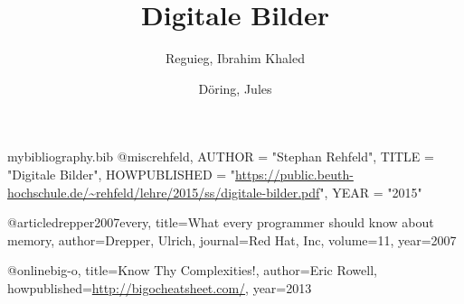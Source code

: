 \RequirePackage{filecontents}
\begin{filecontents}{mybibliography.bib}
@misc{rehfeld,
	AUTHOR = "Stephan Rehfeld",
	TITLE = "{Digitale Bilder}",
	HOWPUBLISHED = "{\url{https://public.beuth-hochschule.de/~rehfeld/lehre/2015/ss/digitale-bilder.pdf}}",
	YEAR = "{2015}"
}

@article{drepper2007every,
  title={What every programmer should know about memory},
  author={Drepper, Ulrich},
  journal={Red Hat, Inc},
  volume={11},
  year={2007}
}

@online{big-o,
  title={Know Thy Complexities!},
  author={Eric Rowell},
  howpublished={\url{http://bigocheatsheet.com/}},
  year={2013}
}

\end{filecontents}	

\documentclass[tog]{acmsiggraph}


\def\BibTeX{{\rm B\kern-.05em{\sc i\kern-.025em b}\kern-.08em
   T\kern-.1667em\lower.7ex\hbox{E}\kern-.125emX}}

\usepackage{listings}

\usepackage{hyperref}

\usepackage[utf8]{inputenc}


\usepackage{cite}

\usepackage{amsfonts}

\usepackage[ngerman]{babel}

\usepackage[autostyle]{csquotes}






\title{Digitale Bilder}

\author{Reguieg, Ibrahim Khaled
\and Döring, Jules}




